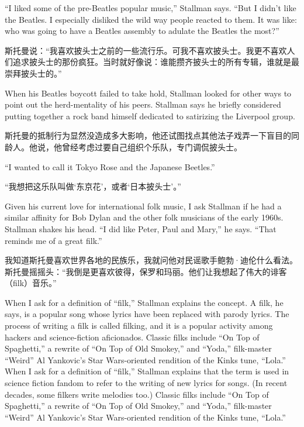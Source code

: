 \ifdefined\eng
``I liked some of the pre-Beatles popular music,'' Stallman says. ``But I didn't like the Beatles. I especially disliked the wild way people reacted to them. It was like: who was going to have a Beatles assembly to adulate the Beatles the most?''
\fi

\ifdefined\chs
斯托曼说：``我喜欢披头士之前的一些流行乐。可我不喜欢披头士。我更不喜欢人们追求披头士的那份疯狂。当时就好像说：谁能攒齐披头士的所有专辑，谁就是最崇拜披头士的。''
\fi

\ifdefined\eng
When his Beatles boycott failed to take hold, Stallman looked for other ways to point out the herd-mentality of his peers. Stallman says he briefly considered putting together a rock band himself dedicated to satirizing the Liverpool group.
\fi

\ifdefined\chs
斯托曼的抵制行为显然没造成多大影响，他还试图找点其他法子戏弄一下盲目的同龄人。他说，他曾经考虑过要自己组织个乐队，专门调侃披头士。
\fi

\ifdefined\eng
``I wanted to call it Tokyo Rose and the Japanese Beetles.''
\fi

\ifdefined\chs
``我想把这乐队叫做`东京花'，或者`日本披头士'。''
\fi

\ifdefined\eng
Given his current love for international folk music, I ask Stallman if he had a similar affinity for Bob Dylan and the other folk musicians of the early 1960s. Stallman shakes his head. ``I did like Peter, Paul and Mary,'' he says. ``That reminds me of a great filk.''
\fi

\ifdefined\chs
我知道斯托曼喜欢世界各地的民族乐，我就问他对民谣歌手鲍勃·迪伦什么看法。斯托曼摇摇头：``我倒是更喜欢彼得，保罗和玛丽。他们让我想起了伟大的诽客（filk）音乐。''
\fi

\ifdefined\eng
\ifdefined\vone
When I ask for a definition of ``filk,'' Stallman explains the concept. A filk, he says, is a popular song whose lyrics have been replaced with parody lyrics. The process of writing a filk is called filking, and it is a popular activity among hackers and science-fiction aficionados. Classic filks include ``On Top of Spaghetti,'' a rewrite of ``On Top of Old Smokey,'' and ``Yoda,'' filk-master ``Weird'' Al Yankovic's Star Wars-oriented rendition of the Kinks tune, ``Lola.''
\fi
\ifdefined\vtwo
When I ask for a definition of ``filk,'' Stallman explains that the term is used in science fiction fandom to refer to the writing of new lyrics for songs.  (In recent decades, some filkers write melodies too.)  Classic filks include ``On Top of Spaghetti,'' a rewrite of ``On Top of Old Smokey,'' and ``Yoda,'' filk-master ``Weird'' Al Yankovic's Star Wars-oriented rendition of the Kinks tune, ``Lola.''
\fi
\fi

